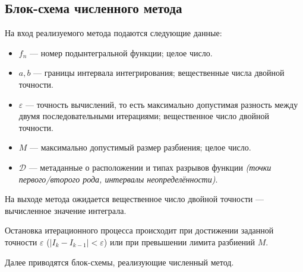 \subsection{Блок-схема численного метода}

На вход реализуемого метода подаются следующие данные:

\begin{itemize}
  \item \(f_n\) --- номер подынтегральной функции; целое число.
  \item \(a, b\) --- границы интервала интегрирования; вещественные числа двойной точности.
  \item \(\varepsilon\) --- точность вычислений, то есть максимально допустимая разность между двумя последовательными итерациями; вещественное число двойной точности.
  \item \(M\) --- максимально допустимый размер разбиения; целое число.
  \item \(\mathcal{D}\) --- метаданные о расположении и типах разрывов функции \textit{(точки первого/второго рода, интервалы неопределённости)}.
\end{itemize}

На выходе метода ожидается вещественное число двойной точности --- вычисленное значение интеграла. 

Остановка итерационного процесса происходит при достижении заданной точности \(\varepsilon\) (\(|I_k - I_{k-1}| < \varepsilon\)) или при превышении лимита разбиений \(M\).

Далее приводятся блок-схемы, реализующие численный метод.

\clearpage
\vspace*{\fill}

